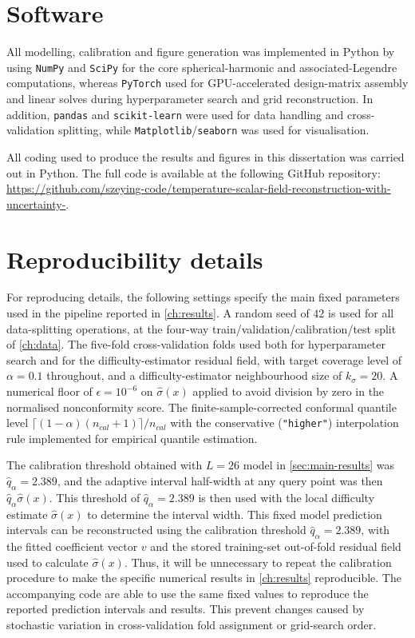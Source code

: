 \section{Software}

All modelling, calibration and figure generation was implemented in Python by using \texttt{NumPy} and \texttt{SciPy} for the core spherical-harmonic and associated-Legendre computations, whereas \texttt{PyTorch} used for GPU-accelerated design-matrix assembly and linear solves during hyperparameter search and grid reconstruction. In addition, \texttt{pandas} and \texttt{scikit-learn} were used for data handling and cross-validation splitting, while \texttt{Matplotlib}/\texttt{seaborn} was used for visualisation.

All coding used to produce the results and figures in this dissertation was carried out in Python. The full code is available at the following GitHub repository: \url{https://github.com/szeying-code/temperature-scalar-field-reconstruction-with-uncertainty-}. 

\section{Reproducibility details}

For reproducing details, the following settings specify the main fixed parameters used in the pipeline reported in \cref{ch:results}. A random seed of $42$ is used for all data-splitting operations, at the four-way train/validation/calibration/test split of \cref{ch:data}. The five-fold cross-validation folds used both for hyperparameter search and for the difficulty-estimator residual field, with target coverage level of $\alpha=0.1$ throughout, and a difficulty-estimator neighbourhood size of $k_\sigma=20$. A numerical floor of $\epsilon=10^{-6}$ on $\hat\sigma(x)$ applied to avoid division by zero in the normalised nonconformity score. The finite-sample-corrected conformal quantile level $\lceil(1-\alpha)(n_{cal}+1)\rceil/n_{cal}$ with the conservative (\texttt{"higher"}) interpolation rule implemented for empirical quantile estimation.

The calibration threshold obtained with $L=26$ model in \cref{sec:main-results} was $\hat q_\alpha = 2.389$, and the adaptive interval half-width at any query point was then $\hat q_\alpha\hat\sigma(x)$. This threshold of $\hat q_\alpha = 2.389$ is then used with the local difficulty estimate $\hat\sigma(x)$ to determine the interval width. This fixed model prediction intervals can be reconstructed using the calibration threshold $\hat q_\alpha = 2.389$, with the fitted coefficient vector $v$ and the stored training-set out-of-fold residual field used to calculate $\hat\sigma(x)$. Thus, it will be unnecessary to repeat the calibration procedure to make the specific numerical results in \cref{ch:results} reproducible. The accompanying code are able to use the same fixed values to reproduce the reported prediction intervals and results. This prevent changes caused by stochastic variation in cross-validation fold assignment or grid-search order.


